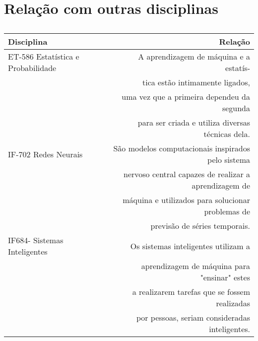 \documentclass[a4paper]{article}
\begin{document}
\section{Relação com outras disciplinas}

\begin{table}[h!]
\centering
\begin{tabular}{l|r}
\hline

Disciplina & Relação  \\\hline
ET-586 Estatística e Probabilidade&A aprendizagem de máquina e a estatís-\\
                              &tica estão intimamente ligados,\\ 
                            & uma vez que a primeira dependeu da segunda\\
               & para ser criada e utiliza diversas técnicas dela.\\\hline
IF-702 Redes Neurais &São modelos computacionais inspirados pelo sistema\\
                  &nervoso central capazes de realizar a aprendizagem de\\                       & máquina e utilizados para solucionar problemas de\\                       & previsão de séries temporais.\\\hline
IF684- Sistemas Inteligentes  & Os sistemas inteligentes utilizam a\\ 	                              &aprendizagem de máquina para "ensinar" estes\\
					&a realizarem tarefas que se fossem realizadas\\
                   & por pessoas, seriam consideradas inteligentes.\\\hline
\end{tabular}
\caption{\label{tab:widgets}}
\end{table}



\nocite{*}
\end{document}
